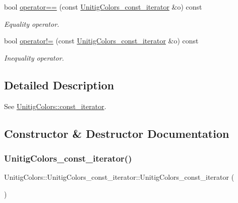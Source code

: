 \begin{DoxyCompactItemize}
bool \hyperlink{classUnitigColors_1_1UnitigColors__const__iterator_aef7249eb114e7a0401beb84372244306}{operator==} (const \hyperlink{classUnitigColors_1_1UnitigColors__const__iterator}{Unitig\+Colors\+\_\+const\+\_\+iterator} \&o) const
\begin{DoxyCompactList}\small\item\em Equality operator. \end{DoxyCompactList}\item 
bool \hyperlink{classUnitigColors_1_1UnitigColors__const__iterator_a7d513e7e2947d5cd948ed9bd816ef94f}{operator!=} (const \hyperlink{classUnitigColors_1_1UnitigColors__const__iterator}{Unitig\+Colors\+\_\+const\+\_\+iterator} \&o) const
\begin{DoxyCompactList}\small\item\em Inequality operator. \end{DoxyCompactList}\end{DoxyCompactItemize}


\subsection{Detailed Description}
See \hyperlink{classUnitigColors_ad4d35f8af18dfd9cad99e92ca2328fee}{Unitig\+Colors\+::const\+\_\+iterator}. 

\subsection{Constructor \& Destructor Documentation}
\mbox{\label{classUnitigColors_1_1UnitigColors__const__iterator_a01ef8ae04a7b535c43a9fea17d9564ab}} 
\subsubsection{\texorpdfstring{Unitig\+Colors\+\_\+const\+\_\+iterator()}{UnitigColors\_const\_iterator()}\hspace{0.1cm}{\footnotesize\ttfamily [1/2]}}
{\footnotesize\ttfamily Unitig\+Colors\+::\+Unitig\+Colors\+\_\+const\+\_\+iterator\+::\+Unitig\+Colors\+\_\+const\+\_\+iterator (\begin{DoxyParamCaption}{ }\end{DoxyParamCaption})}



